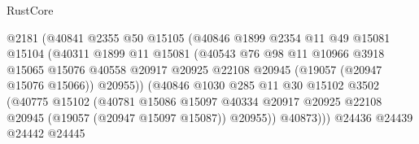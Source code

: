 \begin{lexlean}{RustCore}
\begin{coremodule}
                                  @2181
                                  (@40841
                                    @2355
                                    @50
                                    @15105
                                    (@40846
                                      @1899
                                      @2354
                                      @11
                                      @49
                                      @15081
                                      @15104
                                      (@40311
                                        @1899
                                        @11
                                        @15081
                                        (@40543
                                          @76
                                          @98
                                          @11
                                          @10966
                                          @3918
                                          @15065
                                          @15076
                                          @40558
                                          @20917
                                          @20925
                                          @22108
                                          @20945
                                          (@19057 (@20947 @15076 @15066))
                                          @20955))
                                      (@40846
                                        @1030
                                        @285
                                        @11
                                        @30
                                        @15102
                                        @3502
                                        (@40775
                                          @15102
                                          (@40781
                                            @15086
                                            @15097
                                            @40334
                                            @20917
                                            @20925
                                            @22108
                                            @20945
                                            (@19057 (@20947 @15097 @15087))
                                            @20955))
                                        @40873)))
                                  @24436
                                  @24439
                                  @24442
                                  @24445

\end{coremodule}
\end{lexlean}
